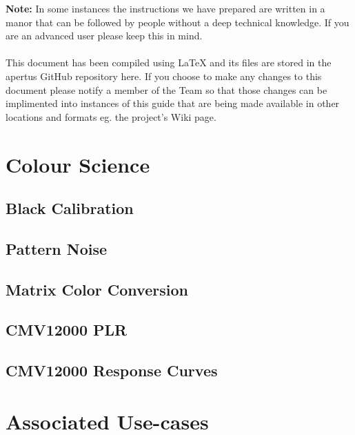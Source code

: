 \documentclass{article}
\begin{document}
\tableofcontents

\vspace*{\fill}
\textbf{Note:} In some instances the instructions we have prepared are written in a manor that can be followed by people without a deep technical knowledge. If you are an advanced user please keep this in mind.\\
\\This document has been compiled using LaTeX and its files are stored in the apertus GitHub repository here. If you choose to make any changes to this document please notify a member of the Team so that those changes can be implimented into instances of this guide that are being made available in other locations and formats eg. the project's Wiki page.

\newpage













\section{Colour Science}
\subsection{Black Calibration}
\subsection{Pattern Noise}
\subsection{Matrix Color Conversion} %
\subsection{CMV12000 PLR}
\subsection{CMV12000 Response Curves}

\section{Associated Use-cases}
\end{document}
